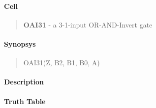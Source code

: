 \label{OAI31}
\paragraph{Cell}
\begin{quote}
    \textbf{OAI31} - a 3-1-input OR-AND-Invert gate
\end{quote}

\paragraph{Synopsys}
\begin{quote}
    OAI31(Z, B2, B1, B0, A)
\end{quote}

\paragraph{Description}



\paragraph{Truth Table}


